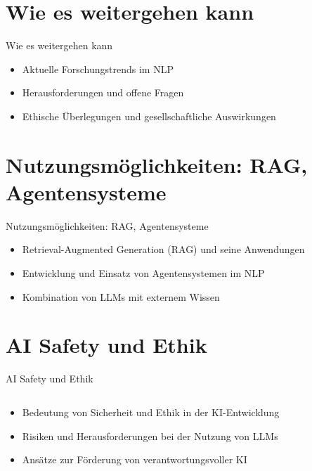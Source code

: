 \documentclass[aspectratio=1610, xcolor=dvipsnames, 9pt]{beamer}
\begin{document}
\section{Wie es weitergehen kann}

\begin{frame}{Wie es weitergehen kann}
  \begin{itemize}
    \item Aktuelle Forschungstrends im NLP
    \item Herausforderungen und offene Fragen
    \item Ethische Überlegungen und gesellschaftliche Auswirkungen
  \end{itemize}
\end{frame}

\section{Nutzungsmöglichkeiten: RAG, Agentensysteme}

\begin{frame}{Nutzungsmöglichkeiten: RAG, Agentensysteme}
  \begin{itemize}
    \item Retrieval-Augmented Generation (RAG) und seine Anwendungen
    \item Entwicklung und Einsatz von Agentensystemen im NLP
    \item Kombination von LLMs mit externem Wissen
  \end{itemize}
\end{frame}


\section{AI Safety und Ethik}
\begin{frame}{AI Safety und Ethik}
  \begin{columns}
    \begin{column}{1\textwidth}
      \begin{itemize}
        \item Bedeutung von Sicherheit und Ethik in der KI-Entwicklung
        \item Risiken und Herausforderungen bei der Nutzung von LLMs
        \item Ansätze zur Förderung von verantwortungsvoller KI
      \end{itemize}
    \end{column}
  \end{columns}
\end{frame}
\end{document}
